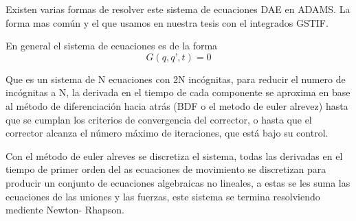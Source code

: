         Existen varias formas de resolver este sistema de ecuaciones DAE en ADAMS. La forma mas común y el que usamos en nuestra tesis con el integrados GSTIF.
        
        En general el sistema de ecuaciones es de la forma
        \begin{equation}
            G(q, q’, t) = 0 
        \end{equation}

        Que es un sistema de N ecuaciones con 2N incógnitas, para reducir el numero de incógnitas a N, la derivada en el tiempo de cada componente se aproxima en base al método de diferenciación hacia atrás (BDF o el metodo de euler alrevez)  hasta que se cumplan los criterios de convergencia del corrector, o hasta que el corrector alcanza el número máximo de iteraciones, que está bajo su control. 
        
        Con el método de euler alreves se discretiza el sistema, todas las derivadas en el tiempo de primer orden del as ecuaciones de movimiento se discretizan para producir un conjunto de ecuaciones algebraicas no lineales, a estas se les suma las ecuaciones de las uniones y las fuerzas, este sistema se termina resolviendo mediente Newton- Rhapson.

        
        
        
        
        

    
    
        
        
    
            
    
    
    


